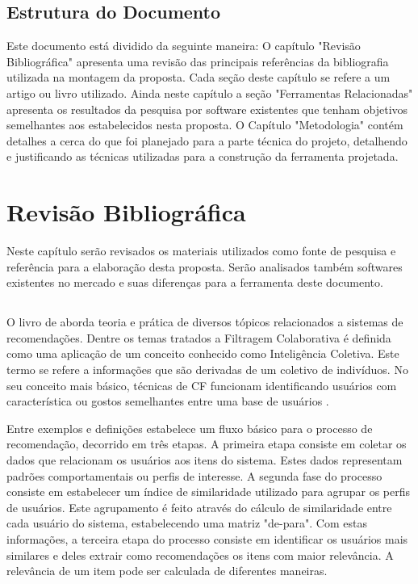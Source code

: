 \documentclass[
	12pt,				%
    oneside,			%
	a4paper,			%
	english,			%
	french,				%
	spanish,			%
	brazil,				%
	]{abntex2}
\begin{document}
\section{Estrutura do Documento}
Este documento está dividido da seguinte maneira: O capítulo "Revisão Bibliográfica" apresenta uma revisão das principais referências da bibliografia utilizada na montagem da proposta.
Cada seção deste capítulo se refere a um artigo ou livro utilizado. Ainda neste capítulo a seção "Ferramentas Relacionadas" apresenta os resultados da pesquisa por software existentes 
que tenham objetivos semelhantes aos estabelecidos nesta proposta. O Capítulo "Metodologia" contém detalhes a cerca do que foi planejado para a parte técnica do projeto, detalhendo e justificando as técnicas utilizadas para a construção da ferramenta
projetada.

\chapter{Revisão Bibliográfica}
Neste capítulo serão revisados os materiais utilizados como fonte de pesquisa e referência para a elaboração desta proposta. Serão analisados também softwares 
existentes no mercado e suas diferenças para a ferramenta deste documento.

\section{}
O livro de  aborda teoria e prática de diversos tópicos relacionados a sistemas de recomendações. Dentre os temas tratados 
a Filtragem Colaborativa é definida como uma aplicação de um conceito conhecido como Inteligência Coletiva. Este termo se refere a informações que são derivadas
de um coletivo de indivíduos. No seu conceito mais básico, técnicas de CF funcionam identificando usuários com característica ou gostos semelhantes entre uma base
de usuários \cite{1-Oreilly}.

Entre exemplos e definições  estabelece um fluxo básico para o processo de recomendação, decorrido em três etapas. A primeira etapa 
consiste em coletar os dados que relacionam os usuários aos itens do sistema. Estes dados representam padrões comportamentais ou perfis de interesse. A segunda
fase do processo consiste em estabelecer um índice de similaridade utilizado para agrupar os perfis de usuários. Este agrupamento é feito através do cálculo de 
similaridade entre cada usuário do sistema, estabelecendo uma matriz "de-para". Com estas informações, a terceira etapa do processo consiste em identificar os
usuários mais similares e deles extrair como recomendações os itens com maior relevância. A relevância de um item pode ser calculada de diferentes maneiras.
\end{document}
